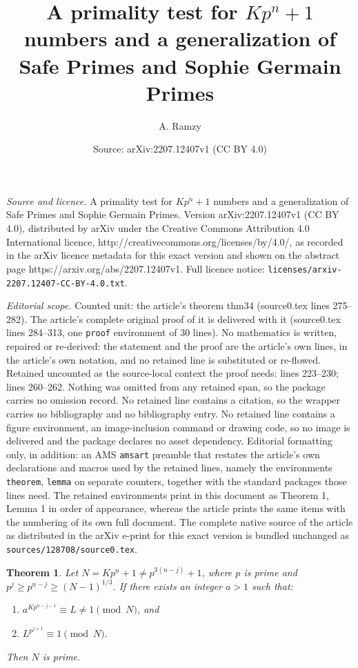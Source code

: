 \documentclass[10pt,a4paper]{amsart}
\title{A primality test for $Kp^n+1$ numbers and a generalization of Safe Primes and Sophie Germain Primes}
\author{A. Ramzy}
\date{Source: arXiv:2207.12407v1 (CC BY 4.0)}
\newtheorem{theorem}{Theorem}
\begin{document}
\maketitle

\noindent\emph{Source and licence.} A primality test for $Kp^n+1$ numbers and a generalization of Safe Primes and Sophie Germain Primes. Version arXiv:2207.12407v1 (CC BY 4.0), distributed by arXiv under the Creative Commons Attribution 4.0 International licence, http://creativecommons.org/licenses/by/4.0/, as recorded in the arXiv licence metadata for this exact version and shown on the abstract page https://arxiv.org/abs/2207.12407v1. Full licence notice: \texttt{licenses/arxiv-2207.12407-CC-BY-4.0.txt}.\par\smallskip

\noindent\textit{Editorial scope.} Counted unit: the article's theorem thm34 (source0.tex lines 275--282). The article's complete original proof of it is delivered with it (source0.tex lines 284--313, one \texttt{proof} environment of 30 lines). No mathematics is written, repaired or re-derived: the statement and the proof are the article's own lines, in the article's own notation, and no retained line is substituted or re-flowed.  Retained uncounted as the source-local context the proof needs: lines 223--230; lines 260--262.  Nothing was omitted from any retained span, so the package carries no omission record.  No retained line contains a citation, so the wrapper carries no bibliography and no bibliography entry.  No retained line contains a figure environment, an image-inclusion command or drawing code, so no image is delivered and the package declares no asset dependency.  Editorial formatting only, in addition: an AMS \texttt{amsart} preamble that restates the article's own declarations and macros used by the retained lines, namely the environments \texttt{theorem}, \texttt{lemma} on separate counters, together with the standard packages those lines need.  The retained environments print in this document as Theorem 1, Lemma 1 in order of appearance, whereas the article prints the same items with the numbering of its own full document.  The complete native source of the article as distributed in the arXiv e-print for this exact version is bundled unchanged as \texttt{sources/128708/source0.tex}.
\begin{theorem}\label{thm31}
	Let $N=Kp^n+1 \neq p^{3(n-j)}+1$,  where $p$ is prime and $p^j \ge p^{n-j} \ge (N-1)^{1/3}$. If there exists an integer $a>1$ such that: 
	\begin{enumerate}
		\item[(i)] $a^{Kp^{n-j-1}} \equiv L \neq 1 \pmod N$, and
		\item[(ii)] $L^{p^{j+1}} \equiv 1 \pmod N$.
	\end{enumerate}
	Then $N$ is prime.
\end{theorem}
\end{document}
